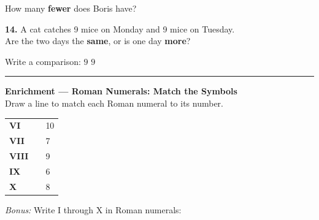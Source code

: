 \documentclass[12pt, letterpaper]{article}
\newcommand{\answerline}{\underline{\hspace{2.5cm}}}
\newcommand{\symbox}{\fbox{\hspace{0.7cm}}}  %
\begin{document}
\bigskip
\noindent How many \textbf{fewer} does Boris have? \hfill \answerline

\bigskip\bigskip
\noindent\textbf{14.} A cat catches 9 mice on Monday and 9 mice on Tuesday.\\[4pt]
Are the two days the \textbf{same}, or is one day \textbf{more}? \hfill \answerline

\bigskip
\noindent Write a comparison: \quad $9$ \quad \symbox \quad $9$

\bigskip
\noindent\textcolor{scholared}{\rule{\linewidth}{0.4pt}}

\begin{lessonbox}
\textcolor{scholared}{\textbf{Enrichment — Roman Numerals: Match the Symbols}}\\[6pt]
\noindent Draw a line to match each Roman numeral to its number.\\[8pt]
\begin{center}
\begin{tabular}{p{2cm} p{3cm} p{2cm}}
  \textbf{VI}   & \hspace{1cm} & 10 \\[6pt]
  \textbf{VII}  & \hspace{1cm} & 7  \\[6pt]
  \textbf{VIII} & \hspace{1cm} & 9  \\[6pt]
  \textbf{IX}   & \hspace{1cm} & 6  \\[6pt]
  \textbf{X}    & \hspace{1cm} & 8  \\
\end{tabular}
\end{center}
\medskip
\noindent\textit{Bonus:} Write I through X in Roman numerals: \quad \answerline
\end{lessonbox}
\end{document}
